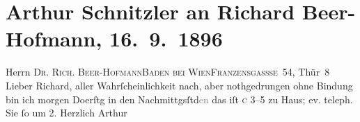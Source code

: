 

         
         \renewcommand{\erwaehntePersonen}{Personen: Richard Beer-Hofmann}
         \renewcommand{\erwaehnteOrte}{Orte: Baden bei Wien, IX., Alsergrund, Kaiser-Franz-Ring, Wien}
         \renewcommand{\erwaehnteWerke}{}
               \section[Arthur Schnitzler an Richard Beer-Hofmann, 16. 9. 1896]{ Arthur Schnitzler an Richard Beer-Hofmann, 16. 9. 1896}\nopagebreak{}\rehead{ }\begin{ledgroupsized}[t]{13cm}\normalsize\beginnumbering{} \toendnotes[C]{\smallbreak\pagebreak[2]} 
\pstart{}{\pb}Herrn \textsc{Dr. Rich.
                     Beer-Hofmann}\pend{}\pstart{}\textsc{Baden bei Wien}\pend{}\pstart{}\textsc{Franzensgassse 54}, Thür 8 \pend{}{\bigskip}\pstart
           \noindent{}{\pb}Lieber Richard, aller Wahrſcheinlichkeit nach, aber nothgedrungen
               ohne Bindung bin ich morgen Do{\geminationn}erſtg{ }{\pb}in den Nachmittgsſtd\textcolor{gray}{en} das iſt \textsc{c}{ }3–5 zu Haus; ev. teleph. Sie ſo um 2. Herzlich\pend
           \pstart \spacefill\mbox{Arthur}\pend{}
         
         \endnumbering{}\end{ledgroupsized}  \newcommand{\dateiname}{L00592}\newcommand{\titel}{Arthur Schnitzler an Richard Beer-Hofmann, 16. 9. 1896}\newcommand{\editorInnen}{Martin Anton Müller und Gerd-Hermann Susen}
      